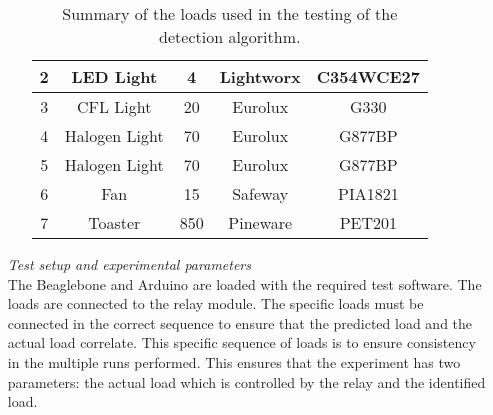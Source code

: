 \begin{itemize}
\begin{itemize}
\begin{table}[H]
{\begin{tabular}{|ccccc|}
            \multicolumn{1}{|c|}{2} & \multicolumn{1}{c|}{LED Light}     & \multicolumn{1}{c|}{4}   & \multicolumn{1}{c|}{Lightworx} & C354WCE27 \\ \hline
            \multicolumn{1}{|c|}{3} & \multicolumn{1}{c|}{CFL Light}     & \multicolumn{1}{c|}{20}  & \multicolumn{1}{c|}{Eurolux}   & G330      \\ \hline
            \multicolumn{1}{|c|}{4} & \multicolumn{1}{c|}{Halogen Light} & \multicolumn{1}{c|}{70}  & \multicolumn{1}{c|}{Eurolux}   & G877BP    \\ \hline
            \multicolumn{1}{|c|}{5} & \multicolumn{1}{c|}{Halogen Light} & \multicolumn{1}{c|}{70}  & \multicolumn{1}{c|}{Eurolux}   & G877BP    \\ \hline
            \multicolumn{1}{|c|}{6} & \multicolumn{1}{c|}{Fan}           & \multicolumn{1}{c|}{15}  & \multicolumn{1}{c|}{Safeway}   & PIA1821   \\ \hline
            \multicolumn{1}{|c|}{7} & \multicolumn{1}{c|}{Toaster}       & \multicolumn{1}{c|}{850} & \multicolumn{1}{c|}{Pineware}  & PET201    \\ \hline
        \end{tabular}
        }
        \caption{Summary of the loads used in the testing of the detection algorithm.}
        \label{tab:load}
        \end{table}
    \end{itemize}
    \item [\emph{Test setup and experimental parameters}]\mbox{}\\
    The Beaglebone and Arduino are loaded with the required test software. The loads are connected to the relay module. The specific loads must be connected in the correct sequence to ensure that the predicted load and the actual load correlate. This specific sequence of loads is to ensure consistency in the multiple runs performed. This ensures that the experiment has two parameters: the actual load which is controlled by the relay and the identified load.  
    

\end{itemize}
